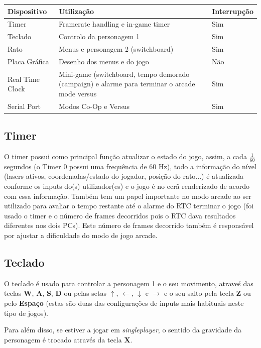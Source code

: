 \documentclass{report}
\begin{document}
\begin{center}
	\begin{tabular}{|p{3cm}|p{8cm}|p{2cm}|} 
		\hline
			Dispositivo & Utilização & Interrupção \\ 
		\hline
		\hline
			Timer & Framerate handling e in-game timer  & Sim \\ 
			Teclado & Controlo da personagem 1 & Sim \\ 
			Rato & Menus e personagem 2 (switchboard) & Sim\\
			Placa Gráfica & Desenho dos menus e do jogo & Não\\
			Real Time Clock & Mini-game (switchboard, tempo demorado (campaign) e alarme para terminar o arcade mode versus & Sim\\
			Serial Port & Modos Co-Op e Versus & Sim \\
		\hline
	\end{tabular}
\end{center}

\subsection{Timer}

O timer possui como principal função atualizar o estado do jogo, assim, a cada $\frac{1}{60}$ segundos (o Timer 0 possui uma frequência de 60 Hz), todo a informação do nível (lasers ativos, coordenadas/estado do jogador, posição do rato...) é atualizada conforme os inputs do(s) utilizador(es) e o jogo é no ecrã renderizado de acordo com essa informação.
Também tem um papel importante no modo arcade ao ser utilizado para avaliar o tempo restante até o alarme do RTC terminar o jogo (foi usado o timer e o número de frames decorridos pois o RTC dava resultados diferentes nos dois PCs). Este número de frames decorrido também é responsável por ajustar a dificuldade do modo de jogo arcade.

\subsection{Teclado}

O teclado é usado para controlar a personagem 1 e o seu movimento, atraveś das teclas \textbf{W}, \textbf{A}, \textbf{S}, \textbf{D} ou pelas setas $\uparrow$, $\leftarrow$, $\downarrow$ e $\rightarrow$ e o seu salto pela tecla \textbf{Z} ou pelo \textbf{Espaço} (estas são duas das configurações de inputs mais habituais neste tipo de jogos).

Para além disso, se estiver a jogar em \textit{singleplayer}, o sentido da gravidade da personagem é trocado através da tecla \textbf{X}.
\end{document}
